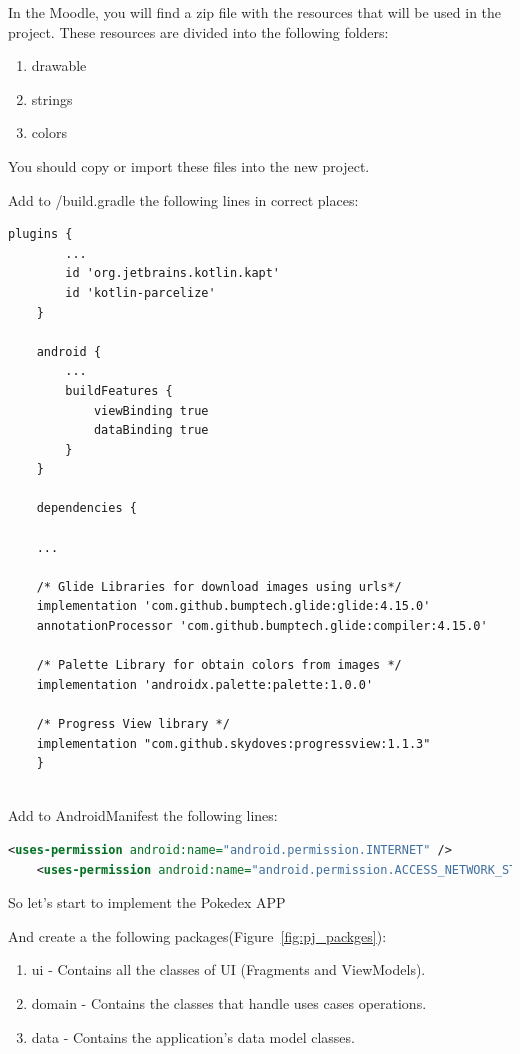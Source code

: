 \documentclass[a4paper, 12pt]{article}
\begin{document}
In the Moodle, you will find a zip file with the resources that will be used in the project.
These resources are divided into the following folders:

\begin{enumerate}
    \item drawable
    \item strings
    \item colors
\end{enumerate}
You should copy or import these files into the new project.

Add to /build.gradle the following lines in correct places:

\begin{lstlisting}[caption={/build.gradle.}, label={code:gradle}, language=XML]
    plugins {
        ...
        id 'org.jetbrains.kotlin.kapt'
        id 'kotlin-parcelize'
    }

    android { 
        ...
        buildFeatures {
            viewBinding true
            dataBinding true
        }
    }

    dependencies {

    ...

    /* Glide Libraries for download images using urls*/
    implementation 'com.github.bumptech.glide:glide:4.15.0'
    annotationProcessor 'com.github.bumptech.glide:compiler:4.15.0'

    /* Palette Library for obtain colors from images */
    implementation 'androidx.palette:palette:1.0.0'

    /* Progress View library */
    implementation "com.github.skydoves:progressview:1.1.3"
    }
    
\end{lstlisting}


Add to AndroidManifest the following lines:

\begin{lstlisting}[caption={Android Manifest}, label={code:android_manifest}, language=XML]
    <uses-permission android:name="android.permission.INTERNET" />
    <uses-permission android:name="android.permission.ACCESS_NETWORK_STATE" />
\end{lstlisting}


So let's start to implement the Pokedex APP 

And create a the following packages(Figure~\ref{fig:pj_packges}):

\begin{enumerate}
	\item ui - Contains all the classes of UI (Fragments and ViewModels).
	\item domain - Contains the classes that handle uses cases operations.
	\item data - Contains the application's data model classes.
\end{enumerate}
\end{document}
